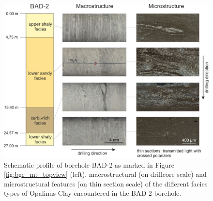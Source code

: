 \begin{figure}[!ht]
\centering
\includegraphics[width=1\textwidth]{./figures/bgr_AD_experiment.jpg}
\caption{Schematic profile of borehole BAD-2 as marked in Figure \ref{fig:bgr_mt_topview} (left), macrostructural (on drillcore scale) and microstructural features (on thin section scale) of the different facies types of Opalinus Clay encountered in the BAD-2 borehole.}
\label{fig:bgr_AD_experiment}
\end{figure}